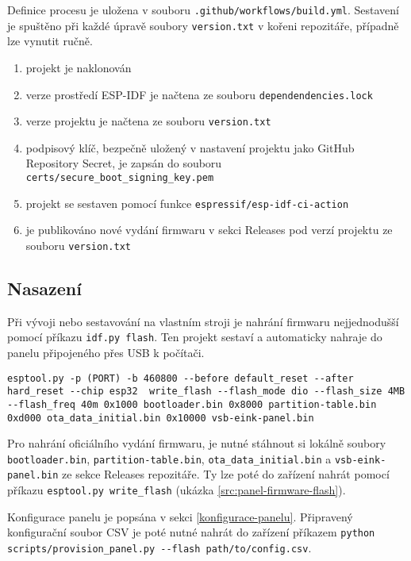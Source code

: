 Definice procesu je uložena v souboru \lstinline|.github/workflows/build.yml|. Sestavení je spuštěno při každé úpravě soubory \lstinline|version.txt| v kořeni repozitáře, případně lze vynutit ručně.

\begin{enumerate}
    \item projekt je naklonován
    \item verze prostředí ESP-IDF je načtena ze souboru \lstinline|dependendencies.lock|
    \item verze projektu je načtena ze souboru \lstinline|version.txt|
    \item podpisový klíč, bezpečně uložený v nastavení projektu jako GitHub Repository Secret\cite{UsingSecretsGitHub}, je zapsán do souboru \lstinline|certs/secure_boot_signing_key.pem|
    \item projekt se sestaven pomocí funkce \lstinline|espressif/esp-idf-ci-action|
    \item je publikováno nové vydání firmwaru v sekci Releases pod verzí projektu ze souboru \lstinline|version.txt|
\end{enumerate}

\subsection{Nasazení}
Při vývoji nebo sestavování na vlastním stroji je nahrání firmwaru nejjednodušší pomocí příkazu \lstinline|idf.py flash|. Ten projekt sestaví a automaticky nahraje do panelu připojeného přes USB k počítači.

\begin{lstlisting}[label=src:panel-firmware-flash, caption={Nahrání oficiálního firmwaru do panelu}]
esptool.py -p (PORT) -b 460800 --before default_reset --after hard_reset --chip esp32  write_flash --flash_mode dio --flash_size 4MB --flash_freq 40m 0x1000 bootloader.bin 0x8000 partition-table.bin 0xd000 ota_data_initial.bin 0x10000 vsb-eink-panel.bin
\end{lstlisting}

Pro nahrání oficiálního vydání firmwaru, je nutné stáhnout si lokálně soubory \lstinline|bootloader.bin|, \lstinline|partition-table.bin|, \lstinline|ota_data_initial.bin| a \lstinline|vsb-eink-panel.bin| ze sekce Releases repozitáře. Ty lze poté do zařízení nahrát pomocí příkazu \lstinline|esptool.py write_flash| (ukázka \ref{src:panel-firmware-flash}).

Konfigurace panelu je popsána v sekci \ref{konfigurace-panelu}. Připravený konfigurační soubor CSV je poté nutné nahrát do zařízení příkazem \lstinline|python scripts/provision_panel.py --flash path/to/config.csv|.

